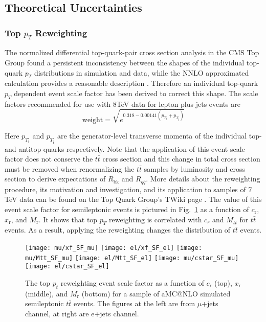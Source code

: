 \documentclass{cmspaperpdf}
\begin{document}
\subsection{Theoretical Uncertainties}

\subsubsection{Top $p_{T}$ Reweighting}

The normalized differential top-quark-pair cross section analysis in the CMS Top Group found a persistent inconsistency between the shapes of the individual top-quark $p_{T}$ distributions in simulation and data, while the NNLO approximated calculation \cite{Kidonakis2012} provides a reasonable description \cite{pT_reweighting_TWiki}. Therefore an individual top-quark $p_{T}$ dependent event scale factor has been derived to correct this shape. The scale factors recommended for use with 8TeV data for lepton plus jets events are 
\begin{equation}
\mathrm{weight} = \sqrt{e^{0.318-0.00141(p_{T_{t}}+p_{T_{\bar{t}}})}}
\end{equation}

Here $p_{T_t}$ and $p_{T_{\bar t}}$ are the generator-level transverse momenta of the individual top- and antitop-quarks respectively. Note that the application of this event scale factor does not conserve the $t\bar{t}$ cross section and this change in total cross section must be removed when renormalizing the $t\bar{t}$ samples by luminosity and cross section to derive expectations of $R_\mathrm{bk}$ and $R_{q\bar q}$. More details about the reweighting procedure, its motivation and investigation, and its application to samples of 7 TeV data can be found on the Top Quark Group's TWiki page \cite{pT_reweighting_TWiki}. The value of this event scale factor for semileptonic events is pictured in Fig.~\ref{fig:top_pT_SF} as a function of $c_\mathrm{r}$, $x_\mathrm{r}$, and $M_\mathrm{r}$. It shows that top $p_T$ reweighting is correlated with $c_r$ and $M_{t\bar t}$ for $t\bar{t}$ events. As a result, applying the reweighting changes the distribution of $t\bar{t}$ events.

\begin{figure}[hbt]
  \begin{center}
    \texttt{[image: mu/xf\_SF\_mu]}
    \texttt{[image: el/xf\_SF\_el]}   
    \texttt{[image: mu/Mtt\_SF\_mu]}
    \texttt{[image: el/Mtt\_SF\_el]}
    \texttt{[image: mu/cstar\_SF\_mu]}
    \texttt{[image: el/cstar\_SF\_el]}
  \caption{\small The top $p_{t}$ reweighting event scale factor as a function of $c_\mathrm{r}$ (top), $x_\mathrm{r}$ (middle), and $M_\mathrm{r}$ (bottom) for a sample of aMC@NLO simulated semileptonic $t\bar{t}$ events.  The figures at the left are from $\mu$+jets channel, at right are e+jets channel.}
    \label{fig:top_pT_SF}
  \end{center}
\end{figure}
\end{document}
